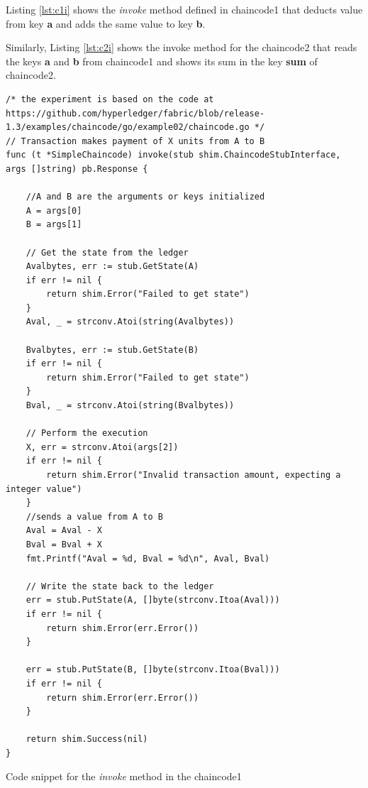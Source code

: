 \documentclass[
  a4paper,  %
  twoside,  %
  bibliography=totoc,
  headsepline,
  cleardoublepage=empty,
  parskip=half,
  draft=false
]{scrbook}
\begin{document}
Listing \ref{lst:c1i} shows the \textit{invoke} method defined in chaincode1 that deducts value from key \textbf{a} and adds the same value to key \textbf{b}.

Similarly, Listing \ref{lst:c2i} shows the invoke method for the chaincode2 that reads the keys \textbf{a} and \textbf{b} from chaincode1 and shows its sum in the key \textbf{sum} of chaincode2.
\begin{Listing}[h!]
\begin{lstlisting}
/* the experiment is based on the code at https://github.com/hyperledger/fabric/blob/release-1.3/examples/chaincode/go/example02/chaincode.go */
// Transaction makes payment of X units from A to B
func (t *SimpleChaincode) invoke(stub shim.ChaincodeStubInterface, args []string) pb.Response {
	
    //A and B are the arguments or keys initialized
	A = args[0]
	B = args[1]

	// Get the state from the ledger
	Avalbytes, err := stub.GetState(A)
	if err != nil {
		return shim.Error("Failed to get state")
	}
	Aval, _ = strconv.Atoi(string(Avalbytes))

	Bvalbytes, err := stub.GetState(B)
	if err != nil {
		return shim.Error("Failed to get state")
	}
	Bval, _ = strconv.Atoi(string(Bvalbytes))

	// Perform the execution
	X, err = strconv.Atoi(args[2])
	if err != nil {
		return shim.Error("Invalid transaction amount, expecting a integer value")
	}
	//sends a value from A to B
	Aval = Aval - X
	Bval = Bval + X
	fmt.Printf("Aval = %d, Bval = %d\n", Aval, Bval)

	// Write the state back to the ledger
	err = stub.PutState(A, []byte(strconv.Itoa(Aval)))
	if err != nil {
		return shim.Error(err.Error())
	}

	err = stub.PutState(B, []byte(strconv.Itoa(Bval)))
	if err != nil {
		return shim.Error(err.Error())
	}

	return shim.Success(nil)
}

\end{lstlisting}
\caption{Code snippet for the \textit{invoke} method in the chaincode1}
\label{lst:c1i}
\end{Listing}
\end{document}
